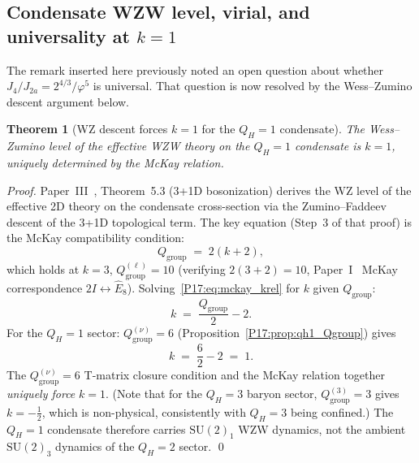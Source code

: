 \documentclass[11pt,a4paper]{article}
\newtheorem{theorem}{Theorem}[section]
\theoremstyle{definition}\newtheorem{definition}[theorem]{Definition}
\theoremstyle{remark}
\newcommand{\vp}{\varphi}
\newcommand{\Ja}{J_{2a}}
\newcommand{\Jfour}{J_4}
\newcommand{\QH}{Q_H}
\begin{document}
\subsection{Condensate WZW level, virial, and universality at $k=1$}
\label{P17:sec:k1_dynamics}

The remark inserted here previously noted an open question about whether
$\Jfour/\Ja=2^{4/3}/\vp^5$ is universal.  That question is now resolved
by the Wess--Zumino descent argument below.

\begin{theorem}[WZ descent forces $k=1$ for the $\QH=1$ condensate]
\label{P17:thm:kone_forced}
The Wess--Zumino level of the effective WZW theory on the $\QH=1$
condensate is $k=1$, uniquely determined by the McKay relation.
\end{theorem}

\begin{proof}
Paper~III~\cite{Paper3}, Theorem~5.3 (3+1D bosonization) derives the
WZ level of the effective 2D theory on the condensate cross-section
via the Zumino--Faddeev descent of the 3+1D topological term.
The key equation (Step~3 of that proof) is the McKay compatibility
condition:
\begin{equation}
  Q_{\mathrm{group}} \;=\; 2(k+2),
  \label{P17:eq:mckay_krel}
\end{equation}
which holds at $k=3$, $Q_{\mathrm{group}}^{(\ell)}=10$
(verifying $2(3+2)=10$, Paper~I~\cite{Paper1} McKay correspondence
$2I\leftrightarrow\widehat{E}_8$).
Solving~\eqref{P17:eq:mckay_krel} for $k$ given $Q_{\mathrm{group}}$:
\begin{equation}
  k \;=\; \frac{Q_{\mathrm{group}}}{2} - 2.
  \label{P17:eq:k_from_Qgroup}
\end{equation}
For the $\QH=1$ sector: $Q_{\mathrm{group}}^{(\nu)}=6$
(Proposition~\ref{P17:prop:qh1_Qgroup}) gives
\begin{equation}
  k \;=\; \frac{6}{2}-2 \;=\; 1.
  \label{P17:eq:kone}
\end{equation}
The $Q_{\mathrm{group}}^{(\nu)}=6$ T-matrix closure condition and the
McKay relation together \emph{uniquely force} $k=1$.
(Note that for the $\QH=3$ baryon sector, $Q_{\mathrm{group}}^{(3)}=3$
gives $k=-\tfrac12$, which is non-physical, consistently with $\QH=3$
being confined.)
The $\QH=1$ condensate therefore carries $\mathrm{SU}(2)_1$ WZW dynamics,
not the ambient $\mathrm{SU}(2)_3$ dynamics of the $\QH=2$ sector.
\qed
\end{proof}
\end{document}
